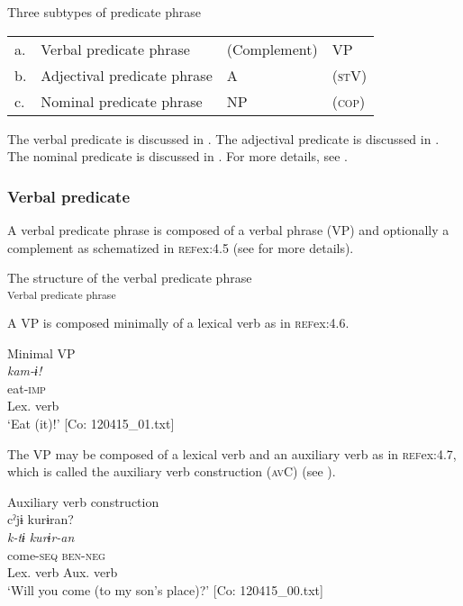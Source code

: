 \ea Three subtypes of predicate phrase\\\label{ex:4.4}
\begin{tabular}{@{}l@{ }lll@{}}
  a. & Verbal predicate phrase     & (Complement) &  VP\footnotemark[1] \\
  b. & Adjectival predicate phrase &    A\footnotemark[2]         & (\textsc{st}V\footnotemark[3])\\
  c. & Nominal predicate phrase    &  NP          & (\textsc{cop}\footnotemark[4])\\
\end{tabular}
\z
{}

The verbal predicate is discussed in . The adjectival predicate is discussed in . The nominal predicate is discussed in . For more details, see .

\subsubsection{Verbal predicate}\label{sec:4.1.3.1}

A verbal predicate phrase is composed of a verbal phrase (VP) and optionally a complement as schematized in \textsc{ref}{ex:4.5} (see  for more details).

\ea\label{ex:4.5}  The structure of the verbal predicate phrase\\\textsubscript{Verbal predicate phrase}
\z

A VP is composed minimally of a lexical verb as in \textsc{ref}{ex:4.6}.

\ea\label{ex:4.6}  Minimal VP\\
    \glll \textit{kam-ɨ!}\\
    eat-\textsc{imp}\\
    {Lex. verb}\\
    \glt     ‘Eat (it)!’   [Co: 120415\_01.txt]
\z

The VP may be composed of a lexical verb and an auxiliary verb as in \textsc{ref}{ex:4.7}, which is called the auxiliary verb construction (\textsc{av}C) (see ).

\ea\label{ex:4.7}Auxiliary verb construction\\
    \gllll cˀjɨ  kurɨran?\\
    \textit{k-tɨ}  \textit{kurɨr-an}\\
    come-\textsc{seq}  \textsc{ben}-\textsc{neg}\\
    {Lex. verb}  {Aux. verb}\\
    \glt     ‘Will you come (to my son’s place)?’    [Co: 120415\_00.txt]
\z

